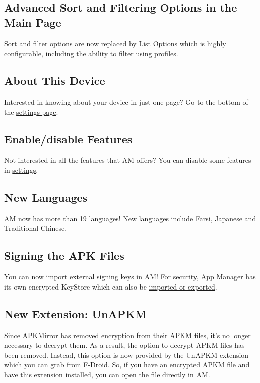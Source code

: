 \subsection{Advanced Sort and Filtering Options in the Main Page}
Sort and filter options are now replaced by \hyperref[subsubsec:main-list-options]{List Options} which is highly configurable,
including the ability to filter using profiles.

\subsection{About This Device}
Interested in knowing about your device in just one page?
Go to the bottom of the \hyperref[subsec:device-info]{settings page}.

\subsection{Enable/disable Features}
Not interested in all the features that AM offers?
You can disable some features in \hyperref[subsec:enable/disable-features]{settings}.

\subsection{New Languages}
AM now has more than 19 languages!
New languages include Farsi, Japanese and Traditional Chinese.

\subsection{Signing the APK Files}
You can now import external signing keys in AM! For security, App Manager has its own encrypted KeyStore which can also be \hyperref[subsec:import/export-keystore]{imported or exported}.

\subsection{New Extension: UnAPKM}
Since APKMirror has removed encryption from their APKM files, it's no longer necessary to decrypt them.
As a result, the option to decrypt APKM files has been removed.
Instead, this option is now provided by the UnAPKM extension which you can grab from \href{https://f-droid.org/packages/io.github.muntashirakon.unapkm/}{F-Droid}.
So, if you have an encrypted APKM file and have this extension installed, you can open the file directly in AM\@.


